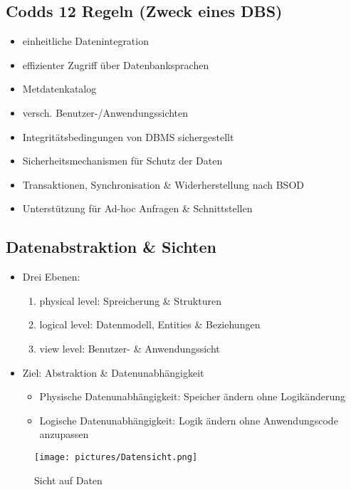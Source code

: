 \documentclass[12pt,a4paper]{article}
\begin{document}
\subsection{Codds 12 Regeln (Zweck eines DBS)}

\begin{itemize}
\item einheitliche Datenintegration
\item effizienter Zugriff über Datenbanksprachen
\item Metdatenkatalog
\item versch. Benutzer-/Anwendungssichten
\item Integritätsbedingungen von DBMS sichergestellt
\item Sicherheitsmechanismen für Schutz der Daten
\item Transaktionen, Synchronisation \& Widerherstellung nach BSOD
\item Unterstützung für Ad-hoc Anfragen \& Schnittstellen
\end{itemize}

\subsection{Datenabstraktion \& Sichten}

\begin{itemize}
\item Drei Ebenen:
\begin{enumerate}
\item physical level: Spreicherung \& Strukturen
\item logical level: Datenmodell, Entities \& Beziehungen
\item view level: Benutzer- \& Anwendungssicht
\end{enumerate}
\item Ziel: Abstraktion \& Datenunabhängigkeit
\begin{itemize}
\item Physische Datenunabhängigkeit: Speicher ändern ohne Logikänderung
\item Logische Datenunabhängigkeit: Logik ändern ohne Anwendungscode anzupassen
\end{itemize}
\end{itemize}

\begin{figure}[H]
\centering
\texttt{[image: pictures/Datensicht.png]}
\caption{Sicht auf Daten}
\end{figure}
\end{document}
